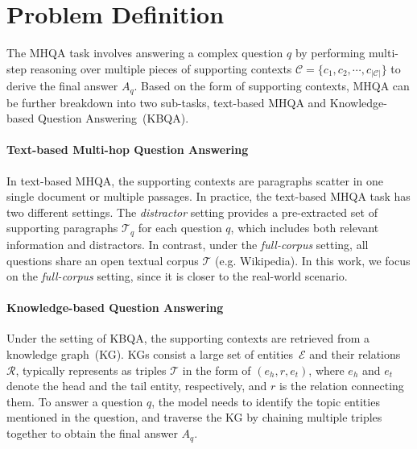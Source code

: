 
\section{Problem Definition}
\label{probelm_definition}
The MHQA task involves answering a complex question $q$ by performing multi-step reasoning over multiple pieces of supporting contexts $\mathcal{C}=\{c_1, c_2, \cdots, c_{|\mathcal{C}|}\}$ to derive the final answer $A_q$. Based on the form of supporting contexts, MHQA can be further breakdown into two sub-tasks, text-based MHQA and Knowledge-based Question Answering~(KBQA).

\paragraph{Text-based Multi-hop Question Answering}
In text-based MHQA, the supporting contexts are paragraphs scatter in one single document or multiple passages. In practice, the text-based MHQA task has two different settings. The \textit{distractor} setting provides a pre-extracted set of supporting paragraphs $\mathcal{T}_q$ for each question $q$, which includes both relevant information and distractors. In contrast, under the \textit{full-corpus} setting, all questions share an open textual corpus $\mathcal{T}$ (e.g. Wikipedia). In this work, we focus on the \textit{full-corpus} setting, since it is closer to the real-world scenario. 

\paragraph{Knowledge-based Question Answering}
Under the setting of KBQA, the supporting contexts are retrieved from a knowledge graph~(KG). KGs consist a large set of entities~$\mathcal{E}$ and their relations~$\mathcal{R}$, typically represents as triples $\mathcal{T}$ in the form of $(e_h,r,e_t)$, where $e_h$ and $e_t$ denote the head and the tail entity, respectively, and $r$ is the relation connecting them. To answer a question $q$, the model needs to identify the topic entities mentioned in the question, and traverse the KG by chaining multiple triples together to obtain the final answer $A_q$.


